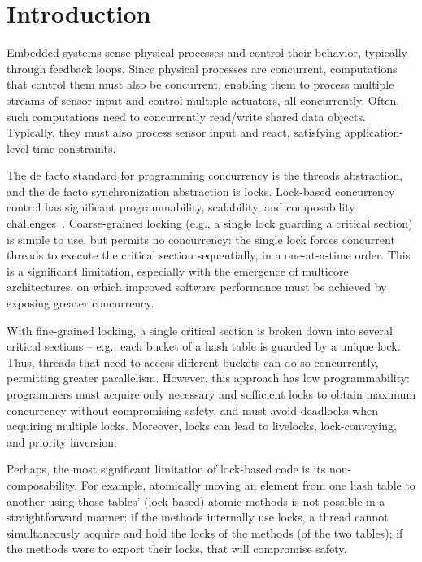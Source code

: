 \chapter{\label{ch:introduction}Introduction}

Embedded systems sense physical processes and control their behavior, typically through feedback loops. Since physical processes are concurrent, computations that control them must also be concurrent, enabling them to process multiple streams of sensor input and control multiple actuators, all concurrently. Often, such computations need to concurrently read/write shared data objects. Typically, they must also process sensor input and react, satisfying application-level time constraints. 

The de facto standard for programming concurrency is the threads abstraction, and the de facto synchronization abstraction is locks. Lock-based concurrency control has significant programmability, scalability, and composability challenges~\cite{Herlihy:2006:AMP:1146381.1146382}. Coarse-grained locking (e.g., a single lock guarding a critical section) is simple to use, but permits no concurrency: the single lock forces concurrent threads to execute the critical section sequentially, in a one-at-a-time order. This is a significant limitation, especially with the emergence of multicore architectures, on which improved software performance must be achieved by exposing greater concurrency.  

With fine-grained locking, a single critical section is broken down into several critical sections -- e.g., each bucket of a hash table is guarded by a unique lock. Thus, threads that need to access different buckets can do so concurrently, permitting greater parallelism. However, this approach has low programmability: programmers must acquire only necessary and sufficient locks to obtain maximum concurrency without compromising safety, and must avoid deadlocks when acquiring multiple locks. Moreover, locks can lead to livelocks, lock-convoying, and priority inversion. 

Perhaps, the most significant limitation of lock-based code is its non-composability. For example, atomically moving an element from one hash table to another using those tables' (lock-based) atomic methods is not possible in a straightforward manner: if the methods internally use locks, a thread cannot simultaneously acquire and hold the locks of the methods (of the two tables); if the methods were to export their locks, that will compromise safety. 

